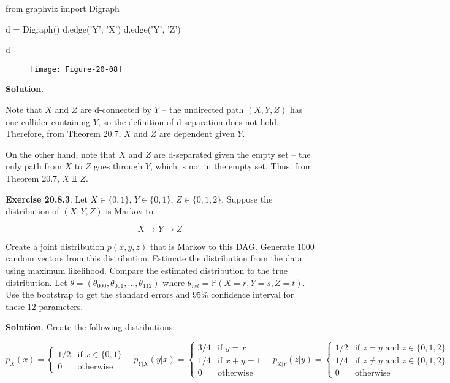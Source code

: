 \begin{python}
from graphviz import Digraph

d = Digraph()
d.edge('Y', 'X')
d.edge('Y', 'Z')

d
\end{python}

\begin{figure}[H]
\centering
\texttt{[image: Figure-20-08]}
\end{figure}

\textbf{Solution}.

Note that \(X\) and \(Z\) are d-connected by \(Y\) -- the undirected
path \((X, Y, Z)\) has one collider containing \(Y\), so the definition
of d-separation does not hold. Therefore, from Theorem 20.7, \(X\) and
\(Z\) are dependent given \(Y\).

On the other hand, note that \(X\) and \(Z\) are d-separated given the
empty set -- the only path from \(X\) to \(Z\) goes through \(Y\), which
is not in the empty set. Thus, from Theorem 20.7, \(X \text{ ⫫ } Z\).

\textbf{Exercise 20.8.3}. Let \(X \in \{0, 1\}\), \(Y \in \{0, 1\}\),
\(Z \in \{ 0, 1, 2 \}\). Suppose the distribution of \((X, Y, Z)\) is
Markov to:

\[ X \longrightarrow Y \longrightarrow Z \]

Create a joint distribution \(p(x, y, z)\) that is Markov to this DAG.
Generate 1000 random vectors from this distribution. Estimate the
distribution from the data using maximum likelihood. Compare the
estimated distribution to the true distribution. Let
\(\theta = (\theta_{000}, \theta_{001}, \dots, \theta_{112})\) where
\(\theta_{rst} = \mathbb{P}(X = r, Y = s, Z = t)\). Use the bootstrap to
get the standard errors and 95\% confidence interval for these 12
parameters.

\textbf{Solution}. Create the following distributions:

\[ p_X(x) = \begin{cases}
1/2 & \text{if } x \in \{0, 1\} \\
0 & \text{otherwise}
\end{cases}
\quad
p_{Y | X}(y | x) = \begin{cases}
3/4 & \text{if } y = x \\
1/4 & \text{if } x + y = 1 \\
0 & \text{otherwise}
\end{cases}
\quad
p_{Z | Y}(z | y) = \begin{cases}
1/2 &\text{if } z = y \text{ and } z \in \{ 0, 1, 2 \}\\
1/4 &\text{if } z \neq y \text{ and } z \in \{ 0, 1, 2 \} \\
0 &\text{otherwise}
\end{cases}
\]

